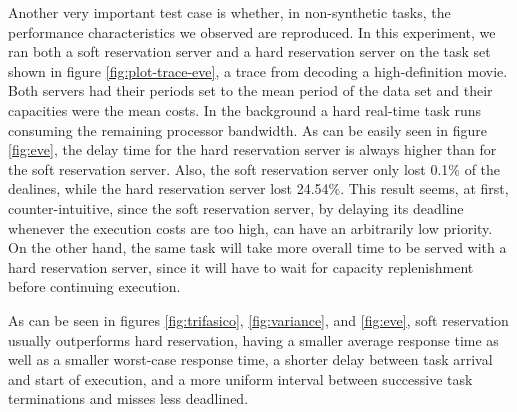 \documentclass[times, 10pt,twocolumn]{article}
\begin{document}
Another very important test case is whether, in non-synthetic tasks,
the performance characteristics we observed are reproduced. In this
experiment, we ran both a soft reservation server and a hard
reservation server on the task set shown in figure
\ref{fig:plot-trace-eve}, a trace from decoding a high-definition
movie. Both servers had their periods set to the mean period of the
data set and their capacities were the mean costs. In the background a
hard real-time task runs consuming the remaining processor
bandwidth. As can be easily seen in figure \ref{fig:eve}, the delay
time for the hard reservation server is always higher than for the
soft reservation server. Also, the soft reservation server only lost
0.1\% of the dealines, while the hard reservation server lost
24.54\%. This result seems, at first, counter-intuitive, since the
soft reservation server, by delaying its deadline whenever the
execution costs are too high, can have an arbitrarily low priority. On
the other hand, the same task will take more overall time to be served
with a hard reservation server, since it will have to wait for
capacity replenishment before continuing execution.


\label{sec:conclusion}

As can be seen in figures \ref{fig:trifasico}, \ref{fig:variance}, and
\ref{fig:eve}, soft reservation usually outperforms hard reservation,
having a smaller average response time as well as a smaller worst-case
response time, a shorter delay between task arrival and start of
execution, and a more uniform interval between successive task
terminations and misses less deadlined. 



\end{document}

